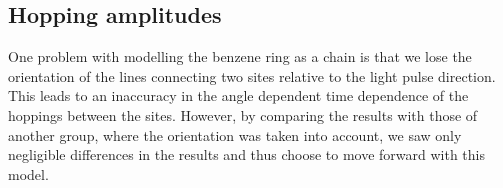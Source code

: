 \subsection{Hopping amplitudes}
One problem with modelling the benzene ring as a chain is that we lose the orientation of the lines connecting two sites relative to the light pulse direction.
This leads to an inaccuracy in the angle dependent time dependence of the hoppings between the sites. However, by comparing the results with those of another group, where the orientation was taken into account, we saw only negligible differences in the results and thus choose to move forward with this model.
    
